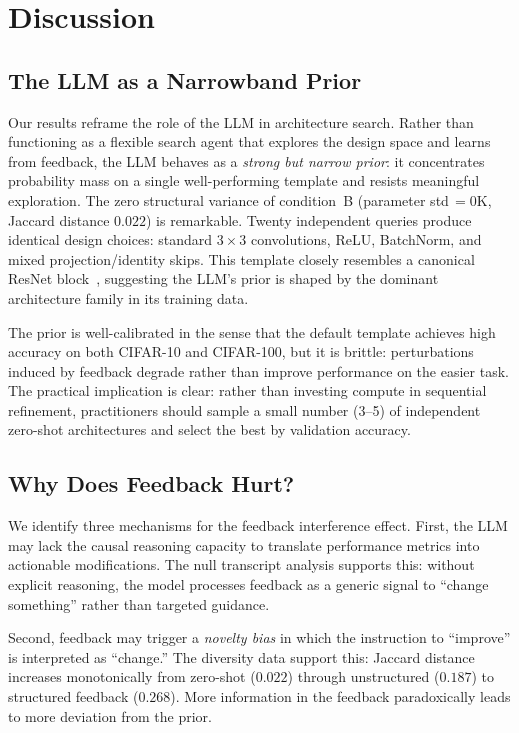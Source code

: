 \documentclass[10pt]{article}
\begin{document}
\section{Discussion}
\label{sec:discussion}

\subsection{The LLM as a Narrowband Prior}

Our results reframe the role of the LLM in architecture search.  Rather than
functioning as a flexible search agent that explores the design space and learns
from feedback, the LLM behaves as a \emph{strong but narrow prior}: it
concentrates probability mass on a single well-performing template and resists
meaningful exploration.  The zero structural variance of condition~B (parameter
std\,$= 0$K, Jaccard distance $0.022$) is remarkable.  Twenty independent
queries produce identical design choices: standard $3{\times}3$ convolutions,
ReLU, BatchNorm, and mixed projection/identity skips.  This template closely
resembles a canonical ResNet block~\citep{he2016resnet}, suggesting the LLM's
prior is shaped by the dominant architecture family in its training data.

The prior is well-calibrated in the sense that the default template achieves
high accuracy on both CIFAR-10 and CIFAR-100, but it is brittle: perturbations
induced by feedback degrade rather than improve performance on the easier task.
The practical implication is clear: rather than investing compute in sequential
refinement, practitioners should sample a small number (3--5) of independent
zero-shot architectures and select the best by validation accuracy.

\subsection{Why Does Feedback Hurt?}

We identify three mechanisms for the feedback interference effect.  First, the
LLM may lack the causal reasoning capacity to translate performance metrics into
actionable modifications.  The null transcript analysis supports this: without
explicit reasoning, the model processes feedback as a generic signal to ``change
something'' rather than targeted guidance.

Second, feedback may trigger a \emph{novelty bias} in which the instruction to
``improve'' is interpreted as ``change.''  The diversity data support this:
Jaccard distance increases monotonically from zero-shot ($0.022$) through
unstructured ($0.187$) to structured feedback ($0.268$).  More information in the
feedback paradoxically leads to more deviation from the prior.
\end{document}
